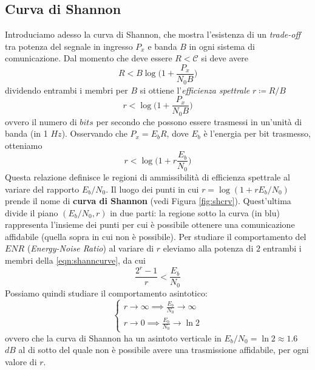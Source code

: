 \subsection{Curva di Shannon}
Introduciamo adesso la curva di Shannon, che mostra l'esistenza di un \textit{trade-off} tra potenza del segnale in ingresso $P_x$ e banda $B$ in ogni sistema di comunicazione. Dal momento che deve essere $R < \mathcal{C}$ si deve avere
\begin{equation}
    R < B \log \bigg ( 1 + \frac{P_x}{N_0 B}\bigg )
\end{equation}
dividendo entrambi i membri per $B$ si ottiene l'\textit{efficienza spettrale} $r \coloneqq R/B$
\begin{equation}
    r < \log \bigg ( 1 + \frac{P_x}{N_0 B} \bigg )
\end{equation}
ovvero il numero di $bits$ per secondo che possono essere trasmessi in un'unit\`a di banda (in 1 $Hz$). Osservando che $P_x = E_b R$, dove $E_b$ \`e l'energia per bit trasmesso, otteniamo
\begin{equation}
\label{eqn:shanncurve}
    r < \log \bigg (1 + r \frac{E_b}{N_0} \bigg )
\end{equation}
Questa relazione definisce le regioni di ammissibilit\`a di efficienza spettrale al variare del rapporto $E_b/N_0$. Il luogo dei punti in cui $r = \log (1 + r E_b/N_0 )$ prende il nome di \textbf{curva di Shannon} (vedi Figura \ref{fig:shcrv}). Quest'ultima divide il piano $(E_b/N_0, r)$ in due parti: la regione sotto la curva (in blu) rappresenta l'insieme dei punti per cui \`e possibile ottenere una comunicazione affidabile (quella sopra in cui non \`e possibile). Per studiare il comportamento del $ENR$ (\textit{Energy-Noise Ratio}) al variare di $r$ eleviamo alla potenza di $2$ entrambi i membri della \ref{eqn:shanncurve}, da cui
\begin{equation}
\frac{2^r - 1}{r} < \frac{E_b}{N_0}
\end{equation}
Possiamo quindi studiare il comportamento asintotico:
    \begin{equation*}
    \begin{cases}
        r \to \infty \implies \frac{E_b}{N_0} \to \infty \\
        r \to 0 \implies \frac{E_b}{N_0} \to \ln 2
    \end{cases}
    \end{equation*}
ovvero che la curva di Shannon ha un asintoto verticale in $E_b/N_0 = \ln 2 \approx 1.6$ $dB$ al di sotto del quale non \`e possibile avere una trasmissione affidabile, per ogni valore di $r$.
